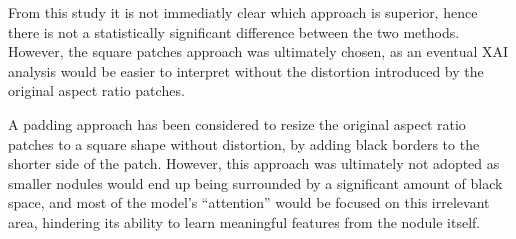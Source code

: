 From this study it is not immediatly clear which approach is superior, hence there is not a statistically significant difference between the two methods. However, the square patches approach was ultimately chosen, as an eventual XAI analysis would be easier to interpret without the distortion introduced by the original aspect ratio patches.

A padding approach has been considered to resize the original aspect ratio patches to a square shape without distortion, by adding black borders to the shorter side of the patch. However, this approach was ultimately not adopted as smaller nodules would end up being surrounded by a significant amount of black space, and most of the model's ``attention'' would be focused on this irrelevant area, hindering its ability to learn meaningful features from the nodule itself.    